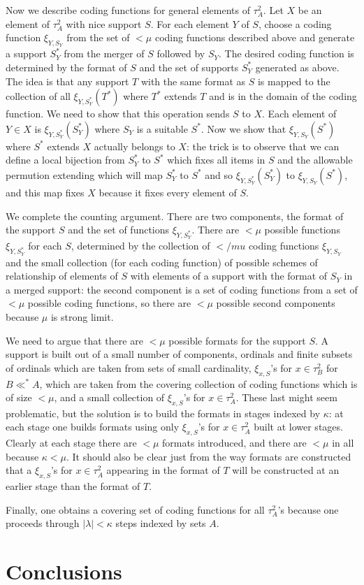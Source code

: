 \documentclass[12pt]{article}
\begin{document}
Now we describe coding functions for general elements of $\tau^2_A$.  Let $X$ be an element of $\tau^2_A$ with nice support $S$.  For each element $Y$ of $S$, choose
a coding function $\xi_{Y,S_Y}$ from the set of $<\mu$ coding functions described above and generate a support $S_Y^*$ from the merger of $S$ followed by $S_Y$.  The desired
coding function is determined by the format of $S$ and the set of supports $S_Y^*$ generated as above.  The idea is that any support $T$ with the same format as
$S$ is mapped to the collection of all $\xi_{Y,S_Y^*}(T^*)$ where $T^*$ extends $T$ and is in the domain of the coding function.   We need to show that this operation sends
$S$ to $X$.  Each element of $Y \in X$ is $\xi_{Y,S_Y^*}(S_Y^*)$ where $S_Y$ is a suitable $S^*$.  Now we show that $\xi_{Y,S_Y}(S^*)$ where $S^*$ extends $X$ actually belongs to $X$:
the trick is to observe that we can define a local bijection from $S_Y^*$ to $S^*$ which fixes all items in $S$ and the allowable permution extending which will map
$S_Y^*$ to $S^*$ and so $\xi_{Y,S_Y^*}(S_Y^*)$ to $\xi_{Y,S_Y}(S^*)$, and this map fixes $X$ because it fixes every element of $S$.

We complete the counting argument.  There are two components, the format of the support $S$ and the set of  functions $\xi_{Y,S_Y^*}$.  There are $<\mu$ possible
functions $\xi_{Y,S_Y^*}$ for each $S$, determined by the collection of $</mu$ coding functions $\xi_{Y,S_Y}$  and the small collection (for each coding function) of possible schemes of relationship of
elements of $S$ with elements of a support with the format of $S_Y$ in a merged support:  the second component is a set of coding functions from a set of $<\mu$ possible coding functions, so there are $<\mu$ possible second components because $\mu$ is strong limit.

We need to argue that there are $<\mu$ possible formats for the support $S$.  A support is built out of a small number of components, ordinals and finite subsets of ordinals
which are taken from sets of small cardinality, $\xi_{x,S}$'s for $x \in \tau^2_B$ for $B \ll^* A$, which are taken from the covering collection of coding functions which is of size $<\mu$,
and a small collection of $\xi_{x,S}$'s for $x \in \tau^2_A$.  These last might seem problematic, but the solution is to build the formats in stages indexed by $\kappa$:  at each
stage one builds formats using only $\xi_{x,S}$'s for $x \in \tau^2_A$ built at lower stages.  Clearly at each stage there are $<\mu$ formats introduced, and there are $<\mu$ in all because $\kappa<\mu$.  It should also be clear just from the way formats are constructed that a $\xi_{x,S}$'s for $x \in \tau^2_A$  appearing in the format of $T$ will be constructed
at an earlier stage than the format of $T$.

Finally, one obtains a covering set of coding functions for all $\tau^2_A$'s because one proceeds through $|\lambda|<\kappa$ steps indexed by sets $A$.

\newpage



\section{Conclusions}
\end{document}
